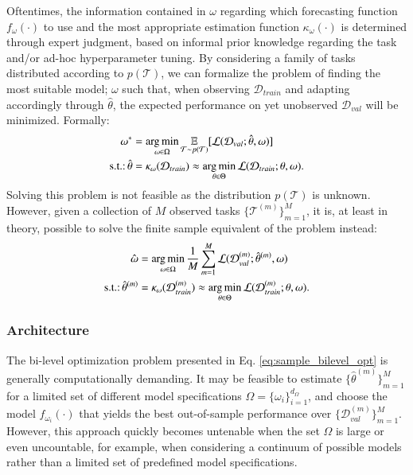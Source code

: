 \documentclass[3p,times,twocolumn]{elsarticle}
\begin{document}
Oftentimes, the information contained in $\omega$ regarding which forecasting function $f_{\omega}(\cdot)$ to use and the most appropriate estimation function $\kappa_{\omega}(\cdot)$ is determined through expert judgment, based on informal prior knowledge regarding the task and/or ad-hoc hyperparameter tuning.
By considering a family of tasks distributed according to $p(\mathcal{T})$, we can formalize the problem of finding the most suitable model; $\omega$ such that, when observing $\mathcal{D}_{train}$ and adapting accordingly through $\hat{\theta}$, the expected performance on yet unobserved $\mathcal{D}_{val}$ will be minimized.
Formally:
\begin{equation}\label{eq:population_bilevel_opt}
    \begin{split}
        \omega^{*}  &=  \underset{\omega\in \Omega}{\arg\min} \, \underset{\mathcal{T}\sim p(\mathcal{T})}{\mathbb{E}} [  \mathcal{L}(\mathcal{D}_{val}; \hat{\theta}, \omega) ] \\
        \textnormal{s.t.:} \,\hat{\theta} &= \kappa_{\omega} (\mathcal{D}_{train}) \approx \underset{\theta \in \Theta}{\arg\min} \, \mathcal{L}(\mathcal{D}_{train};\theta, \omega).
    \end{split}
\end{equation}
Solving this problem is not feasible as the distribution $p(\mathcal{T})$ is unknown. 
However, given a collection of $M$ observed tasks $\lbrace\mathcal{T}^{(m)}\rbrace_{m=1}^{M}$, it is, at least in theory, possible to solve the finite sample equivalent of the problem instead:
\begin{equation}\label{eq:sample_bilevel_opt}
    \begin{split}
        \hat{\omega}  &=  \underset{\omega \in \Omega}{\arg\min} \,  \dfrac{1}{M}\sum_{m=1}^{M} \mathcal{L}(\mathcal{D}_{val}^{(m)}; \hat{\theta}^{(m)}, \omega)  \\
        \textnormal{s.t.:} \,\hat{\theta}^{(m)} &= \kappa_{\omega} (\mathcal{D}_{train}^{(m)}) \approx \underset{\theta \in \Theta}{\arg\min} \, \mathcal{L}(\mathcal{D}_{train}^{(m)};\theta, \omega).
    \end{split}
\end{equation}

\subsubsection{Architecture}

The bi-level optimization problem presented in Eq. \ref{eq:sample_bilevel_opt} is generally computationally demanding. 
It may be feasible to estimate $\{\hat{\theta}^{(m)}\}_{m=1}^{M}$ for a limited set of different model specifications $\Omega = \{\omega_{i}\}_{i=1}^{d_{\Omega}}$, and choose the model $f_{\omega_{i}}(\cdot)$ that yields the best out-of-sample performance over $\{\mathcal{D}^{(m)}_{val}\}_{m=1}^{M}$.
However, this approach quickly becomes untenable when the set $\Omega$ is large or even uncountable, for example, when considering a continuum of possible models rather than a limited set of predefined model specifications.
\end{document}
